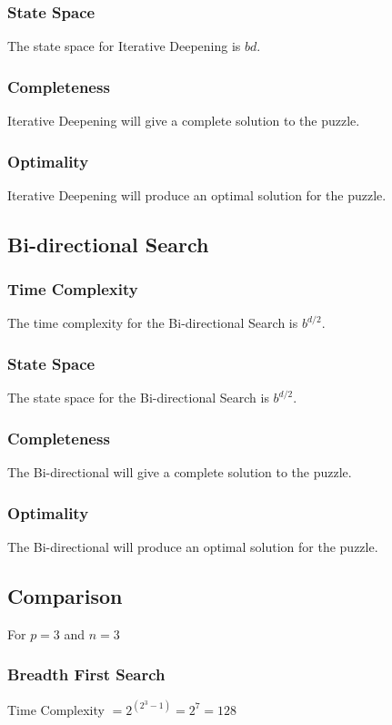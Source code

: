 \documentclass[10pt,letterpaper]{article}
\begin{document}
      \subsubsection{State Space}
	The state space for Iterative Deepening is \(bd\).
      
      \subsubsection{Completeness}
	Iterative Deepening will give a complete solution to the puzzle.
	
      \subsubsection{Optimality}
	Iterative Deepening will produce an optimal solution for the puzzle.
    
    \subsection{Bi-directional Search}
      \subsubsection{Time Complexity}
	The time complexity for the Bi-directional Search is \(b^{d/2}\).
    
      \subsubsection{State Space}
	The state space for the Bi-directional Search is \(b^{d/2}\).
      
      \subsubsection{Completeness}
	The Bi-directional will give a complete solution to the puzzle.
	
      \subsubsection{Optimality}
	The Bi-directional will produce an optimal solution for the puzzle.
    
    \subsection{Comparison}
      For \(p=3\) and \(n=3\)
      
      \subsubsection{Breadth First Search}
	Time Complexity \(=2^{(2^3-1)} = 2^7 = 128\)
	
\end{document}
